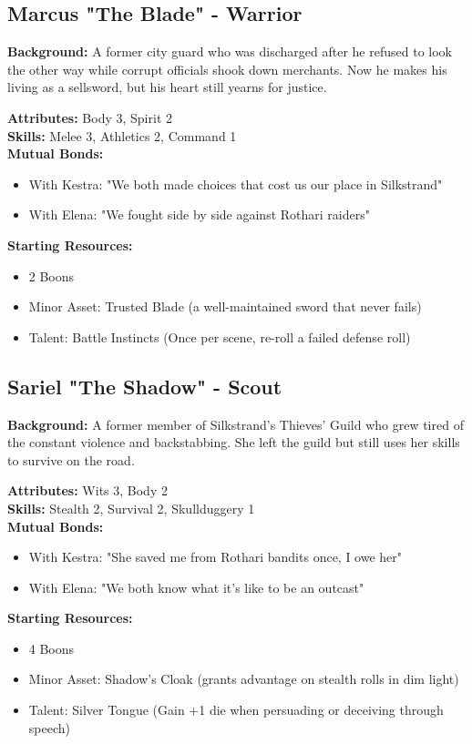\documentclass[11pt]{article}
\newenvironment{characterbox}[1]{%
  \begin{mdframed}[backgroundcolor=shadecolor, linewidth=1pt, linecolor=headercolor]%
  \subsection*{#1}%
}{%
  \end{mdframed}%
}
\begin{document}
\begin{characterbox}{Marcus "The Blade" - Warrior}
\textbf{Background:} A former city guard who was discharged after he refused to look the other way while corrupt officials shook down merchants. Now he makes his living as a sellsword, but his heart still yearns for justice.

\textbf{Attributes:} Body 3, Spirit 2 \\
\textbf{Skills:} Melee 3, Athletics 2, Command 1 \\
\textbf{Mutual Bonds:} 
\begin{itemize}
\item With Kestra: "We both made choices that cost us our place in Silkstrand"
\item With Elena: "We fought side by side against Rothari raiders"
\end{itemize}

\textbf{Starting Resources:}
\begin{itemize}
\item 2 Boons
\item Minor Asset: Trusted Blade (a well-maintained sword that never fails)
\item Talent: Battle Instincts (Once per scene, re-roll a failed defense roll)
\end{itemize}
\end{characterbox}

\begin{characterbox}{Sariel "The Shadow" - Scout}
\textbf{Background:} A former member of Silkstrand's Thieves' Guild who grew tired of the constant violence and backstabbing. She left the guild but still uses her skills to survive on the road.

\textbf{Attributes:} Wits 3, Body 2 \\
\textbf{Skills:} Stealth 2, Survival 2, Skullduggery 1 \\
\textbf{Mutual Bonds:} 
\begin{itemize}
\item With Kestra: "She saved me from Rothari bandits once, I owe her"
\item With Elena: "We both know what it's like to be an outcast"
\end{itemize}

\textbf{Starting Resources:}
\begin{itemize}
\item 4 Boons
\item Minor Asset: Shadow's Cloak (grants advantage on stealth rolls in dim light)
\item Talent: Silver Tongue (Gain +1 die when persuading or deceiving through speech)
\end{itemize}
\end{characterbox}
\end{document}
